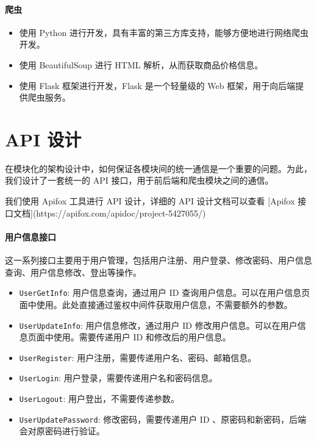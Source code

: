 \subsubsection{爬虫}

\begin{itemize}
  \item 使用 Python 进行开发，具有丰富的第三方库支持，能够方便地进行网络爬虫开发。
  \item 使用 BeautifulSoup 进行 HTML 解析，从而获取商品价格信息。
  \item 使用 Flask 框架进行开发，Flask 是一个轻量级的 Web 框架，用于向后端提供爬虫服务。
\end{itemize}

\chapter{API 设计}

在模块化的架构设计中，如何保证各模块间的统一通信是一个重要的问题。为此，我们设计了一套统一的 API 接口，用于前后端和爬虫模块之间的通信。

我们使用 Apifox 工具进行 API 设计，详细的 API 设计文档可以查看 [Apifox 接口文档](https://apifox.com/apidoc/project-5427055/)

\subsubsection{用户信息接口}

这一系列接口主要用于用户管理，包括用户注册、用户登录、修改密码、用户信息查询、用户信息修改、登出等操作。

\begin{itemize}
  \item \texttt{UserGetInfo}: 用户信息查询，通过用户 ID 查询用户信息。可以在用户信息页面中使用。此处直接通过鉴权中间件获取用户信息，不需要额外的参数。
  \item \texttt{UserUpdateInfo}: 用户信息修改，通过用户 ID 修改用户信息。可以在用户信息页面中使用。需要传递用户 ID 和修改后的用户信息。
  \item \texttt{UserRegister}: 用户注册，需要传递用户名、密码、邮箱信息。
  \item \texttt{UserLogin}: 用户登录，需要传递用户名和密码信息。
  \item \texttt{UserLogout}: 用户登出，不需要传递参数。
  \item \texttt{UserUpdatePassword}: 修改密码，需要传递用户 ID 、原密码和新密码，后端会对原密码进行验证。
\end{itemize}

